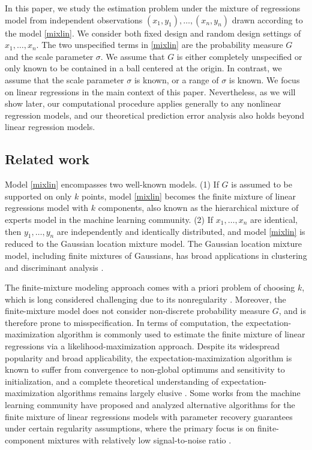 \documentclass[11pt]{article}
\numberwithin{equation}{section}
\newcommand{\EM}{expectation-maximization }
\begin{document}
In this paper, we study the estimation problem under the mixture of regressions model from independent observations $(x_1, y_1),\dots, (x_n,  y_n)$ drawn according to the model \eqref{mixlin}. We consider both fixed design and random design settings of $x_1,\dots,x_n$. The two unspecified terms in \eqref{mixlin} are the probability measure $G$ and the scale parameter $\sigma$. We assume that $G$ is either completely unspecified or only known to be contained in a ball centered at the origin. In contrast, we assume that the scale parameter $\sigma$ is known, or a range of $\sigma$ is known. We focus on linear regressions in the main context of this paper. Nevertheless, as we will show later, our computational procedure applies generally to any nonlinear regression models, and our theoretical prediction error analysis also holds beyond linear regression models. 

\subsection{Related work}
Model \eqref{mixlin} encompasses two well-known models. (1) If $G$ is assumed to be supported on only $k$ points, model \eqref{mixlin} becomes the finite mixture of linear regressions model with $k$ components, also known as the hierarchical mixture of experts model \citep{jordan1994hierarchical} in the machine learning community. (2) If $x_1,\dots,x_n$ are identical, then $y_1,\dots,y_n$ are independently and identically distributed, and model \eqref{mixlin} is reduced to the Gaussian location mixture model. The Gaussian location mixture model, including finite mixtures of Gaussians, has broad applications in clustering and discriminant analysis \citep{cai2019chime}. 

The finite-mixture modeling approach comes with a priori problem of choosing $k$, which is long considered challenging due to its nonregularity \citep{kasahara2015test}. Moreover, the finite-mixture model does not consider non-discrete probability measure $G$, and is therefore prone to misspecification. In terms of computation, the \EM algorithm is commonly used to estimate the finite mixture of linear regressions \citep{faria2010fitting} via a likelihood-maximization approach. Despite its widespread popularity and broad applicability, the \EM algorithm is known to suffer from convergence to non-global optimums and sensitivity to initialization, and a complete theoretical understanding of \EM algorithms remains largely elusive \citep{balakrishnan2017statistical}.  Some works from the machine learning community have proposed and analyzed alternative algorithms for the finite mixture of linear regressions models with parameter recovery guarantees under certain regularity assumptions, where the primary focus is on finite-component mixtures with relatively low signal-to-noise ratio \citep{li2018learning,2019global}.
\end{document}
